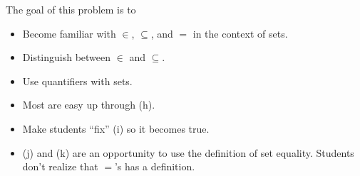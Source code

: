	\question
	\begin{annotation}
		\begin{goals}

			The goal of this problem is to
			\begin{itemize}
				\item Become familiar with $\in$, $\subseteq$, and $=$ in
					the context of sets.
				\item Distinguish between $\in$ and $\subseteq$.
				\item Use quantifiers with sets.
			\end{itemize}
		\end{goals}

		\begin{notes}
			\begin{itemize}
				\item Most are easy up through (h).
				\item Make students ``fix'' (i) so it
					becomes true.
				\item (j) and (k) are an opportunity to use
					the definition of set equality. Students don't
					realize that $=$'s has a definition.
			\end{itemize}
		\end{notes}
	\end{annotation}
